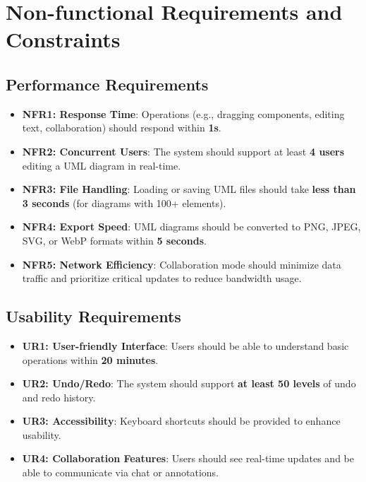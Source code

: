\documentclass[12pt]{article}
\begin{document}


\section{Non-functional Requirements and Constraints}
\subsection{Performance Requirements}
\begin{itemize}
    \item \textbf{NFR1: Response Time}: Operations (e.g., dragging components, editing text, collaboration) should respond within \textbf{1s}.
    \item \textbf{NFR2: Concurrent Users}: The system should support at least \textbf{4 users} editing a UML diagram in real-time.
    \item \textbf{NFR3: File Handling}: Loading or saving UML files should take \textbf{less than 3 seconds} (for diagrams with 100+ elements).
    \item \textbf{NFR4: Export Speed}: UML diagrams should be converted to PNG, JPEG, SVG, or WebP formats within \textbf{5 seconds}.
    \item \textbf{NFR5: Network Efficiency}: Collaboration mode should minimize data traffic and prioritize critical updates to reduce bandwidth usage.
\end{itemize}
\subsection{Usability Requirements}
\begin{itemize}
    \item \textbf{UR1: User-friendly Interface}: Users should be able to understand basic operations within \textbf{20 minutes}.
    \item \textbf{UR2: Undo/Redo}: The system should support \textbf{at least 50 levels} of undo and redo history.
    \item \textbf{UR3: Accessibility}: Keyboard shortcuts should be provided to enhance usability.
    \item \textbf{UR4: Collaboration Features}: Users should see real-time updates and be able to communicate via chat or annotations.
\end{itemize}
\end{document}
